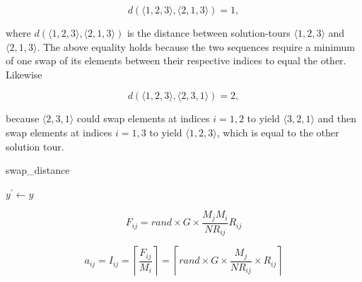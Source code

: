 \documentclass{article}
\begin{document}
            \begin{equation}
                d(\langle 1,2,3 \rangle, \langle 2,1,3 \rangle) = 1,
            \end{equation}

            where $d(\langle 1,2,3 \rangle, \langle 2,1,3 \rangle)$ is the distance between solution-tours $\langle 1,2,3 \rangle$ and $\langle 2,1,3 \rangle$.  The above equality holds because the two sequences require a minimum of one swap of its elements between their respective indices to equal the other.  Likewise

            \begin{equation}
                d(\langle 1,2,3 \rangle, \langle 2,3,1 \rangle) = 2,
            \end{equation}

            because $\langle 2,3,1 \rangle$ could swap elements at indices $i = 1,2$ to yield $\langle 3,2,1 \rangle$ and then swap elements at indices $i = 1,3$ to yield $\langle 1,2,3 \rangle$, which is equal to the other solution tour.

            \begin{algorithm}
                \caption{swap\_distance}
                $y^\prime \gets y$\;
            \end{algorithm}



        \begin{equation} \label{eq:force}
            F_{ij} = rand \times G \times \frac{M_j M_i}{NR_{ij}} R_{ij}
        \end{equation}

        \begin{equation} \label{eq:dml}
            a_{ij} = I_{ij} = \left\lceil \frac{F_{ij}}{M_i} \right\rceil = \left\lceil rand \times G \times \frac{M_j}{NR_{ij}} \times R_{ij} \right\rceil
        \end{equation}
\end{document}
